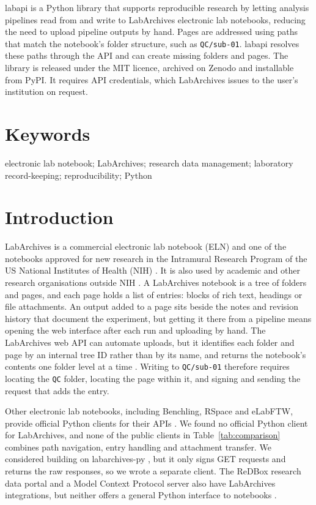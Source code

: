 \documentclass{jors}
\begin{document}
labapi is a Python library that supports reproducible research by letting
analysis pipelines read from and write to LabArchives electronic lab
notebooks, reducing the need to upload pipeline outputs by hand. Pages are addressed using paths that match the
notebook's folder structure, such as \texttt{QC/sub-01}. labapi resolves
these paths through the API and can create missing folders and pages. The
library is released under the MIT licence, archived on Zenodo and
installable from PyPI. It requires API credentials, which LabArchives
issues to the user's institution on request.

\section*{Keywords}

electronic lab notebook; LabArchives; research data management;
laboratory record-keeping; reproducibility; Python

\section*{Introduction}

LabArchives is a commercial electronic lab notebook (ELN) and one of the
notebooks approved for new research in the Intramural Research Program of
the US National Institutes of Health (NIH)
\citep{labarchives,nih_eln_policy}. It is also used by academic and other
research organisations outside NIH \citep{labarchives}. A LabArchives
notebook is a tree of folders and pages, and each page holds a list of
entries: blocks of rich text, headings or file attachments. An output added
to a page sits beside the notes and revision history that document the
experiment, but getting it there from a pipeline means opening the web
interface after each run and uploading by hand. The LabArchives web API can
automate uploads, but it identifies each folder and page by an internal
tree ID rather than by its name, and returns the notebook's contents one
folder level at a time \citep{labarchives_api}.
Writing to \texttt{QC/sub-01} therefore requires locating the \texttt{QC}
folder, locating the page within it, and signing and sending the request
that adds the entry.

Other electronic lab notebooks, including Benchling, RSpace and eLabFTW,
provide official Python clients for their APIs
\citep{benchling_sdk,rspace_client,elabapi_python}. We found no official
Python client for LabArchives, and none of the public clients in
Table~\ref{tab:comparison} combines path navigation, entry handling and
attachment transfer. We considered building on labarchives-py
\citep{mcmero}, but it only signs GET requests and returns the raw
responses, so we wrote a separate client. The ReDBox research data portal
and a Model Context Protocol server also have LabArchives integrations,
but neither offers a general Python interface to notebooks
\citep{redbox_labarchives,labarchives_mcp}.
\end{document}
